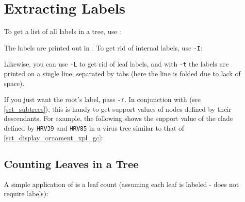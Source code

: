 

\section{Extracting Labels}
\label{sct_labels}

To get a list of all labels in a tree, use :

\begin{samepage}


\end{samepage}

\noindent{}The labels are printed out in \no. To get rid of internal labels,
use \texttt{-I}:

\begin{samepage}


\end{samepage}

\noindent{}Likewise, you can use \texttt{-L} to get rid of leaf labels, and
with \texttt{-t} the labels are printed on a single line, separated by tabs
(here the line is folded due to lack of space).

\begin{samepage}


\end{samepage}

\noindent{}If you just want the root's label, pass \texttt{-r}. In conjunction
with \clade{} (see \ref{sct_subtrees}), this is handy to get support values of
nodes defined by their descendants. For example, the following shows the
support value of the clade defined by \texttt{HRV39} and \texttt{HRV85} in a
virus tree similar to that of \ref{sct_display_ornament_xpl_gc}:

\begin{samepage}


\end{samepage}

\subsection{Counting Leaves in a Tree}
\label{sct_counting_leaves}

A simple application of  is a leaf count (assuming each leaf is
labeled - \nw{} does not require labels):

\begin{samepage}


\end{samepage}
